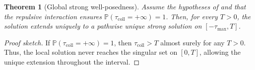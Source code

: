 \documentclass[10pt,a4paper]{amsart}
\newtheorem{theorem}{Theorem}
\newcommand{\Prob}{\mathbb{P}}
\begin{document}
\begin{theorem}[Global strong well-posedness]\label{thm:global}
Assume the hypotheses of  and that the repulsive interaction
ensures $\Prob(\tau_{\mathrm{coll}}=+\infty)=1$. Then, for every $T>0$, the
solution extends uniquely to a pathwise unique strong solution on
$[-\tau_{\max},T]$.
\end{theorem}

\begin{proof}[Proof sketch]
If $\Prob(\tau_{\mathrm{coll}}=+\infty)=1$, then $\tau_{\mathrm{coll}}>T$
almost surely for any $T>0$. Thus, the local solution never reaches the
singular set on $[0,T]$, allowing the unique extension throughout the
interval.
\end{proof}
\end{document}
